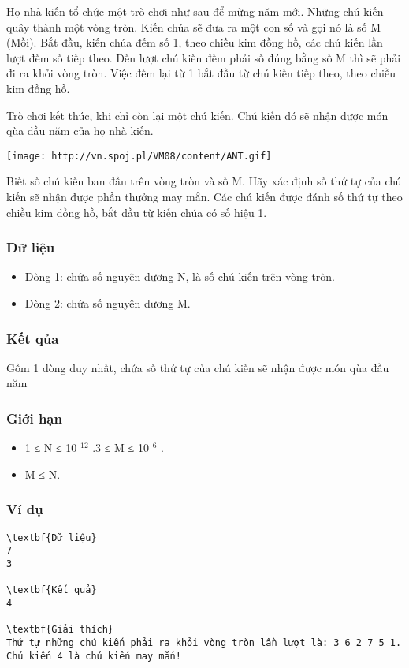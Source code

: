 







   Họ nhà kiến tổ chức một trò chơi như sau để mừng năm mới. Những chú kiến quây thành một vòng tròn. Kiến chúa sẽ   đưa ra một con số và gọi nó là số M (Mồi). Bắt đầu, kiến chúa đếm số 1, theo chiều kim đồng hồ, các chú kiến lần lượt   đếm số tiếp theo. Đến lượt chú kiến đếm phải số đúng bằng số M thì sẽ phải đi ra khỏi vòng tròn. Việc đếm lại từ 1 bắt đầu   từ chú kiến tiếp theo, theo chiều kim đồng hồ.  

   Trò chơi kết thúc, khi chỉ còn lại một chú kiến. Chú kiến đó sẽ nhận được món qùa đầu năm của họ nhà kiến.  


\texttt{[image: http://vn.spoj.pl/VM08/content/ANT.gif]}

   Biết số chú kiến ban đầu trên vòng tròn và số M. Hãy xác định số thứ tự của chú kiến sẽ nhận được phần thưởng may   mắn. Các chú kiến được đánh số thứ tự theo chiều kim đồng hồ, bắt đầu từ kiến chúa có số hiệu 1.  

\subsubsection{   Dữ liệu  }
\begin{itemize}
	\item     Dòng 1: chứa số nguyên dương N, là số chú kiến trên vòng tròn.   
	\item     Dòng 2: chứa số nguyên dương M.   
\end{itemize}

\subsubsection{   Kết qủa  }

   Gồm 1 dòng duy nhất, chứa số thứ tự của chú kiến sẽ  nhận được món qùa đầu năm  

\subsubsection{   Giới hạn  }
\begin{itemize}
	\item     1 ≤ N ≤ 10    $^     12    $    .3 ≤ M ≤ 10    $^     6    $    .   
	\item     M ≤ N.   
\end{itemize}

\subsubsection{   Ví dụ  }
\begin{verbatim}
\textbf{Dữ liệu}
7 
3

\textbf{Kết quả}
4

\textbf{Giải thích}
Thứ tự những chú kiến phải ra khỏi vòng tròn lần lượt là: 3 6 2 7 5 1.
Chú kiến 4 là chú kiến may mắn!
\end{verbatim}

